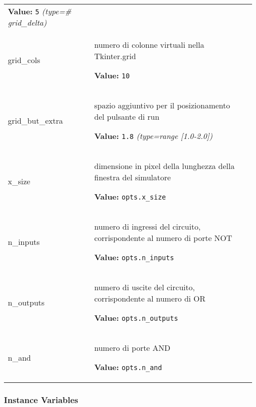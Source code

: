 \begin{longtable}{|p{\varnamewidth}|p{\vardescrwidth}|l}
\textbf{Value:} 
{\tt 5}            {\it (type=\# grid\_delta)}&\\
\cline{1-2}
\raggedright g\-r\-i\-d\-\_\-c\-o\-l\-s\- & \raggedright numero di colonne virtuali nella Tkinter.grid

\textbf{Value:} 
{\tt 10}&\\
\cline{1-2}
\raggedright g\-r\-i\-d\-\_\-b\-u\-t\-\_\-e\-x\-t\-r\-a\- & \raggedright spazio aggiuntivo per il posizionamento del pulsante di run

\textbf{Value:} 
{\tt 1.8}            {\it (type=range [1.0-2.0])}&\\
\cline{1-2}
\raggedright x\-\_\-s\-i\-z\-e\- & \raggedright dimensione in pixel della lunghezza della finestra del simulatore

\textbf{Value:} 
{\tt opts.x\_size}&\\
\cline{1-2}
\raggedright n\-\_\-i\-n\-p\-u\-t\-s\- & \raggedright numero di ingressi del circuito, corrispondente al numero di 
          porte NOT

\textbf{Value:} 
{\tt opts.n\_inputs}&\\
\cline{1-2}
\raggedright n\-\_\-o\-u\-t\-p\-u\-t\-s\- & \raggedright numero di uscite del circuito, corrispondente al numero di OR

\textbf{Value:} 
{\tt opts.n\_outputs}&\\
\cline{1-2}
\raggedright n\-\_\-a\-n\-d\- & \raggedright numero di porte AND

\textbf{Value:} 
{\tt opts.n\_and}&\\
\cline{1-2}
\end{longtable}



  \subsubsection{Instance Variables}

